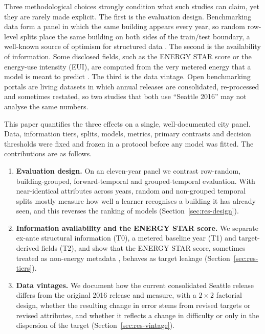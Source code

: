 \documentclass[11pt]{article}
\begin{document}
Three methodological choices strongly condition what such studies can claim, yet they are rarely made explicit. The first is the evaluation design. Benchmarking data form a panel in which the same building appears every year, so random row-level splits place the same building on both sides of the train/test boundary, a well-known source of optimism for structured data \cite{roberts2017cv,kaufman2012leakage,kapoor2023leakage}. The second is the availability of information. Some disclosed fields, such as the ENERGY STAR score or the energy-use intensity (EUI), are computed from the very metered energy that a model is meant to predict \cite{epa2021energystarscore}. The third is the data vintage. Open benchmarking portals are living datasets in which annual releases are consolidated, re-processed and sometimes restated, so two studies that both use ``Seattle 2016'' may not analyse the same numbers.

This paper quantifies the three effects on a single, well-documented city panel. Data, information tiers, splits, models, metrics, primary contrasts and decision thresholds were fixed and frozen in a protocol before any model was fitted. The contributions are as follows.
\begin{enumerate}
  \item \textbf{Evaluation design.} On an eleven-year panel we contrast row-random, building-grouped, forward-temporal and grouped-temporal evaluation. With near-identical attributes across years, random and non-grouped temporal splits mostly measure how well a learner recognises a building it has already seen, and this reverses the ranking of models (Section~\ref{sec:res-design}).
  \item \textbf{Information availability and the ENERGY STAR score.} We separate ex-ante structural information (T0), a metered baseline year (T1) and target-derived fields (T2), and show that the ENERGY STAR score, sometimes treated as non-energy metadata \cite{duan2026ghgbench}, behaves as target leakage (Section~\ref{sec:res-tiers}).
  \item \textbf{Data vintages.} We document how the current consolidated Seattle release differs from the original 2016 release and measure, with a $2\times2$ factorial design, whether the resulting change in error stems from revised targets or revised attributes, and whether it reflects a change in difficulty or only in the dispersion of the target (Section~\ref{sec:res-vintage}).
\end{enumerate}
\end{document}
